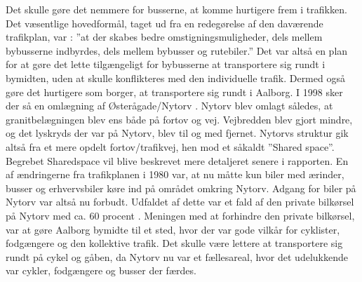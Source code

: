 Det skulle gøre det nemmere for busserne, at komme hurtigere frem i trafikken\autocite{arealplan}. Det  væsentlige hovedformål, taget ud fra en redegørelse af den daværende trafikplan, var :
”at der skabes bedre omstigningsmuligheder, dels mellem bybusserne     indbyrdes, dels mellem bybusser og rutebiler.”
Det var altså en plan for at gøre det lette tilgængeligt for bybusserne at transportere sig rundt i bymidten, uden at skulle konflikteres med den individuelle trafik. Dermed også gøre det hurtigere som borger, at transportere sig rundt i Aalborg.
I 1998 sker der så en omlægning af Østerågade/Nytorv \autocite{omlaegning}.
Nytorv blev omlagt således, at granitbelægningen blev ens både på fortov og vej. Vejbredden blev gjort mindre, og det lyskryds der var på Nytorv, blev til og med fjernet. Nytorvs struktur gik altså fra et mere opdelt fortov/trafikvej, hen mod et såkaldt ”Shared space”. Begrebet Sharedspace vil blive beskrevet mere detaljeret senere i rapporten. En af ændringerne fra trafikplanen i 1980 var, at nu måtte kun biler med ærinder, busser og erhvervsbiler køre ind på området omkring Nytorv. Adgang for biler på Nytorv var altså nu forbudt. Udfaldet af dette var et fald af den private bilkørsel på Nytorv med ca. 60 procent \autocite{omlaegning}.
Meningen med at forhindre den private bilkørsel, var at gøre Aalborg bymidte til et sted, hvor der var gode vilkår for cyklister, fodgængere og den kollektive trafik. Det skulle være lettere at transportere sig rundt på cykel og gåben, da Nytorv nu var et fællesareal, hvor det udelukkende var cykler, fodgængere og busser der færdes.
